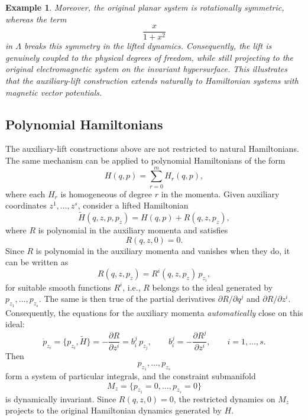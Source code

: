 \documentclass[10pt,a4paper]{article}
\newtheorem{example}{Example}
\begin{document}
\begin{example}
Moreover, the original planar system is rotationally symmetric, whereas the term
\[
\frac{x}{1+x^2}
\]
in \(\Lambda\) breaks this symmetry in the lifted dynamics. Consequently, the lift is genuinely coupled to the physical degrees of freedom, while still projecting to the original electromagnetic system on the invariant hypersurface. This illustrates that the auxiliary-lift construction extends naturally to Hamiltonian systems with magnetic vector potentials.
\end{example}



\subsection{Polynomial Hamiltonians}

The auxiliary-lift constructions above are not restricted to natural Hamiltonians. The same mechanism can be applied to polynomial Hamiltonians of the form
\[
H(q,p)=\sum_{r=0}^{m}H_r(q,p),
\]
where each \(H_r\) is homogeneous of degree \(r\) in the momenta. Given auxiliary coordinates \(z^1,\ldots,z^s\), consider a lifted Hamiltonian
\[
\widetilde H(q,z,p,p_z)
=
H(q,p)+R(q,z,p_z),
\]
where \(R\) is polynomial in the auxiliary momenta and satisfies
\[
R(q,z,0)=0.
\]
Since $R$ is polynomial in the auxiliary momenta and vanishes when they do,
it can be written as
\begin{equation*}
R(q,z,p_z) = R^i(q,z,p_z)\, p_{z_i},
\end{equation*}
for suitable smooth functions $R^i$, i.e., $R$ belongs to the ideal generated by
$p_{z_1}, \ldots, p_{z_s}$. The same is then true of the partial derivatives
$\partial R/\partial q^j$ and $\partial R/\partial z^i$. Consequently, the
equations for the auxiliary momenta \emph{automatically} close on this ideal:
\begin{equation*}
\dot{p}_{z_i} = \{p_{z_i}, \widetilde{H}\}
= -\frac{\partial R}{\partial z^i}
= b_i^j\, p_{z_j},
\qquad
b_i^j = -\frac{\partial R^j}{\partial z^i},
\qquad i = 1, \ldots, s.
\end{equation*}
Then
\[
p_{z_1},\ldots,p_{z_s}
\]
form a system of particular integrals, and the constraint submanifold
\[
M_z=\{p_{z_1}=0,\ldots,p_{z_s}=0\}
\]
is dynamically invariant. Since \(R(q,z,0)=0\), the restricted dynamics on \(M_z\) projects to the original Hamiltonian dynamics generated by \(H\).
\end{document}
